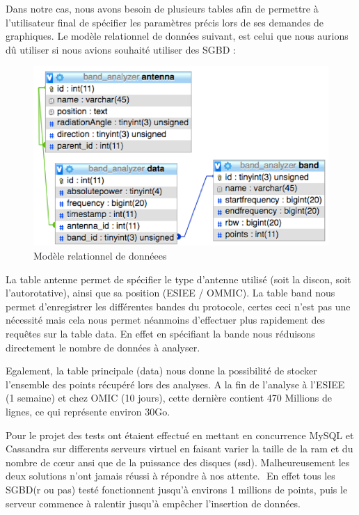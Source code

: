         Dans notre cas, nous avons besoin de plusieurs tables afin de permettre à l’utilisateur final de spécifier les paramètres précis lors de ses demandes de graphiques.
        Le modèle relationnel de données suivant, est celui que nous aurions dû  utiliser si nous avions souhaité utiliser des SGBD :

        \begin{figure}[ht]
            \centering
            \includegraphics[width=1\linewidth]{images/spa/AS_model_data}
            \caption{Modèle relationnel de donnéees}
            \label{fig:AS_model_data}
        \end{figure}


        La table antenne permet de spécifier le type d’antenne utilisé (soit la discon, soit l’autorotative), ainsi que sa position (ESIEE / OMMIC).
        La table band nous permet d’enregistrer les différentes bandes du protocole, certes ceci n’est pas une nécessité mais cela nous permet néanmoins d’effectuer plus rapidement des requêtes sur la table data. En effet en spécifiant la bande nous réduisons directement le nombre de données à analyser.

        Egalement, la table principale (data) nous donne la possibilité de stocker l’ensemble des points récupéré lors des analyses.
        A la fin de l’analyse à l’ESIEE (1 semaine) et chez OMIC (10 jours), cette dernière contient 470 Millions de lignes, ce qui représente environ 30Go.

        Pour le projet des tests ont étaient effectué en mettant en concurrence MySQL et Cassandra sur differents serveurs virtuel en faisant varier la taille de la ram et du nombre de cœur ansi que de la puissance des disques (ssd).
        Malheureusement les deux solutions n’ont jamais réussi à répondre à nos attente.  En effet tous les SGBD(r ou pas) testé fonctionnent jusqu’à environs 1 millions de points, puis le serveur commence à ralentir jusqu’à empêcher l’insertion de données.

